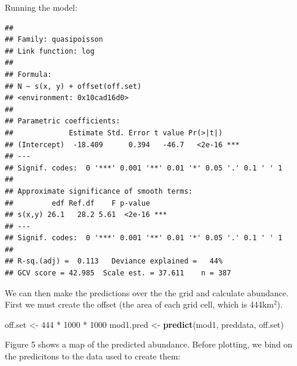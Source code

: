 \documentclass[]{amsart}
\newenvironment{Shaded}{}{}
\newcommand{\KeywordTok}[1]{\textcolor[rgb]{0.00,0.44,0.13}{\textbf{{#1}}}}
\newcommand{\DecValTok}[1]{\textcolor[rgb]{0.25,0.63,0.44}{{#1}}}
\newcommand{\StringTok}[1]{\textcolor[rgb]{0.25,0.44,0.63}{{#1}}}
\newcommand{\NormalTok}[1]{{#1}}
\begin{document}
Running the model:

\begin{Shaded}
\end{Shaded}

\begin{verbatim}
## 
## Family: quasipoisson 
## Link function: log 
## 
## Formula:
## N ~ s(x, y) + offset(off.set)
## <environment: 0x10cad16d0>
## 
## Parametric coefficients:
##             Estimate Std. Error t value Pr(>|t|)    
## (Intercept)  -18.409      0.394   -46.7   <2e-16 ***
## ---
## Signif. codes:  0 '***' 0.001 '**' 0.01 '*' 0.05 '.' 0.1 ' ' 1
## 
## Approximate significance of smooth terms:
##         edf Ref.df    F p-value    
## s(x,y) 26.1   28.2 5.61  <2e-16 ***
## ---
## Signif. codes:  0 '***' 0.001 '**' 0.01 '*' 0.05 '.' 0.1 ' ' 1
## 
## R-sq.(adj) =  0.113   Deviance explained =   44%
## GCV score = 42.985  Scale est. = 37.611    n = 387
\end{verbatim}

We can then make the predictions over the the grid and calculate
abundance. First we must create the offset (the area of each grid cell,
which is 444km$^2$).

\begin{Shaded}
\begin{Highlighting}[]
\NormalTok{off.set <-}\StringTok{ }\DecValTok{444} \NormalTok{*}\StringTok{ }\DecValTok{1000} \NormalTok{*}\StringTok{ }\DecValTok{1000}
\NormalTok{mod1.pred <-}\StringTok{ }\KeywordTok{predict}\NormalTok{(mod1, preddata, off.set)}
\end{Highlighting}
\end{Shaded}

Figure 5 shows a map of the predicted abundance. Before plotting, we
bind on the predicitons to the data used to create them:
\end{document}
